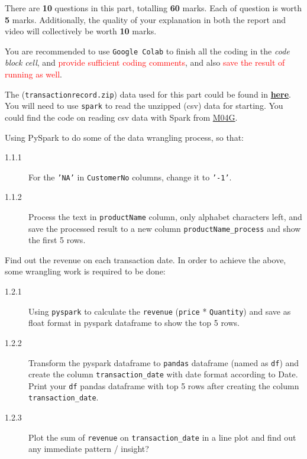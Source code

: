 \documentclass[a4paper]{article}
\begin{document}
    There are \textbf{10} questions in this part, totalling \textbf{60} marks. 
    Each of question is worth \textbf{5} marks. Additionally, the quality of your explanation in both the report and video will collectively be worth \textbf{10} marks.
    
    
    You are recommended to use \texttt{Google Colab} to 
    finish all the coding in the \textit{code block cell},
    and \textcolor{red}{provide sufficient coding comments},
    and also \textcolor{red}{save the result of running as well}. 

    The (\texttt{transactionrecord.zip}) data used for this part could be found in 
    \href{https://github.com/tulip-lab/sit742/blob/develop/Assessment/2024/data/transactionrecord.gz}{\textbf{here}}.
    You will need to use \texttt{spark} to read the unzipped (csv) data for starting.
    You could find the code on reading csv data with Spark from \href{https://github.com/tulip-lab/sit742/blob/develop/Jupyter/M04-DataManipulation/M04G-SparkSQL.ipynb}{M04G}.
    
    \begin{answer}[Question 1.1] 
        Using PySpark to do some of the data wrangling process, so that:
        \begin{description}
            \item[1.1.1] For the \texttt{'NA'} in \texttt{CustomerNo} columns, change it to \texttt{'-1'}.
            \item[1.1.2] Process the text in \texttt{productName} column, only alphabet characters left, and save the processed result to a new column \texttt{productName_process} and show the first 5 rows.

        \end{description}
    
    \end{answer}
    
    \begin{answer}[Question 1.2]
    Find out the revenue on each transaction date. In order to achieve the above, some wrangling work is required to be done:
     \begin{description}
            \item[1.2.1] Using \texttt{pyspark} to calculate the \texttt{revenue} (\texttt{price} * \texttt{Quantity}) and save as float format in pyspark dataframe to show the top 5 rows.
            \item[1.2.2] Transform the pyspark dataframe to \texttt{pandas} dataframe (named as \texttt{df}) and create the column \texttt{transaction_date} with date format according to {Date}. Print your \texttt{df} pandas dataframe with top 5 rows after creating the column \texttt{transaction_date}.
            \item[1.2.3] Plot the sum of \texttt{revenue} on  \texttt{transaction_date} in a line plot and find out any immediate pattern / insight?
    \end{description}
    \end{answer}
    
\end{document}
